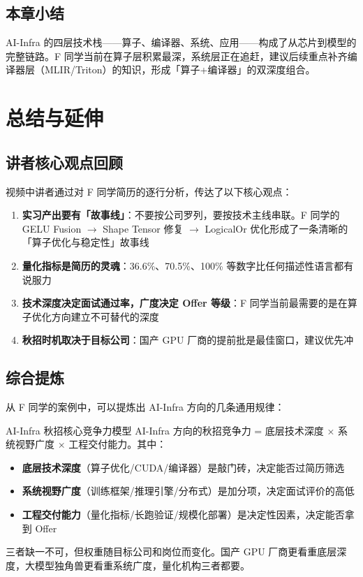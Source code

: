 \documentclass[a4paper]{article}
\begin{document}
\subsection{本章小结}
AI-Infra 的四层技术栈——算子、编译器、系统、应用——构成了从芯片到模型的完整链路。F 同学当前在算子层积累最深，系统层正在追赶，建议后续重点补齐编译器层（MLIR/Triton）的知识，形成「算子+编译器」的双深度组合。

\section{总结与延伸}

\subsection{讲者核心观点回顾}

视频中讲者通过对 F 同学简历的逐行分析，传达了以下核心观点：

\begin{enumerate}
    \item \textbf{实习产出要有「故事线」}：不要按公司罗列，要按技术主线串联。F 同学的 GELU Fusion $\to$ Shape Tensor 修复 $\to$ LogicalOr 优化形成了一条清晰的「算子优化与稳定性」故事线
    \item \textbf{量化指标是简历的灵魂}：36.6\%、70.5\%、100\% 等数字比任何描述性语言都有说服力
    \item \textbf{技术深度决定面试通过率，广度决定 Offer 等级}：F 同学当前最需要的是在算子优化方向建立不可替代的深度
    \item \textbf{秋招时机取决于目标公司}：国产 GPU 厂商的提前批是最佳窗口，建议优先冲
\end{enumerate}

\subsection{综合提炼}

从 F 同学的案例中，可以提炼出 AI-Infra 方向的几条通用规律：

\begin{importantbox}{AI-Infra 秋招核心竞争力模型}
AI-Infra 方向的秋招竞争力 = 底层技术深度 × 系统视野广度 × 工程交付能力。其中：
\begin{itemize}
    \item \textbf{底层技术深度}（算子优化/CUDA/编译器）是敲门砖，决定能否过简历筛选
    \item \textbf{系统视野广度}（训练框架/推理引擎/分布式）是加分项，决定面试评价的高低
    \item \textbf{工程交付能力}（量化指标/长跑验证/规模化部署）是决定性因素，决定能否拿到 Offer
\end{itemize}
三者缺一不可，但权重随目标公司和岗位而变化。国产 GPU 厂商更看重底层深度，大模型独角兽更看重系统广度，量化机构三者都要。
\end{importantbox}
\end{document}
